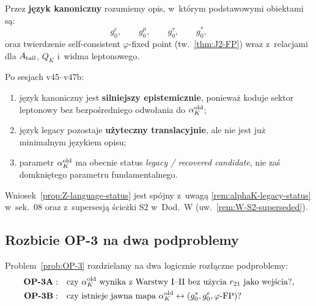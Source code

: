 \begin{definition}\label{def:Z-canonical}
Przez \textbf{j\k{e}zyk kanoniczny} rozumiemy opis,
w~kt\'orym podstawowymi obiektami s\k{a}:
\begin{equation}
  g_0^e, \qquad g_0^\mu, \qquad g_0^\tau, \qquad g_0^*,
\end{equation}
oraz twierdzenie self-consistent $\varphi$-fixed point
(tw.~\ref{thm:J2-FP}) wraz z~relacjami dla
$A_{\rm tail}$, $Q_K$ i~widma leptonowego.
\end{definition}

\begin{proposition}
\label{prop:Z-language-status}
Po sesjach v45--v47b:
\begin{enumerate}[nosep]
  \item j\k{e}zyk kanoniczny jest \textbf{silniejszy epistemicznie},
    poniewa\.z koduje sektor leptonowy bez bezpo\'sredniego
    odwo\l{}ania do $\alpha_K^{\rm old}$;
  \item j\k{e}zyk legacy pozostaje \textbf{u\.zyteczny translacyjnie},
    ale nie jest ju\.z minimalnym j\k{e}zykiem opisu;
  \item parametr $\alpha_K^{\rm old}$ ma obecnie status
    \emph{legacy / recovered candidate}, nie za\'s domkni\k{e}tego
    parametru fundamentalnego.
\end{enumerate}
\end{proposition}

\begin{remark}
Wniosek~\ref{prop:Z-language-status} jest sp\'ojny z~uwag\k{a}
\ref{rem:alphaK-legacy-status} w~sek.~08 oraz z~supersesj\k{a}
\'scie\.zki S2 w~Dod.~W (uw.~\ref{rem:W-S2-superseded}).
\end{remark}

\subsection{Rozbicie OP-3 na dwa podproblemy}
\label{app:Z-OP3-split}

\begin{definition}[Podproblemy OP-3]\label{def:Z-OP3-split}
Problem~\ref{prob:OP-3} rozdzielamy na dwa logicznie roz\l{}\k{a}czne
podproblemy:
\begin{align}
  \textbf{OP-3A}:&\quad
    \text{czy $\alpha_K^{\rm old}$ wynika z~Warstwy~I--II
    bez u\.zycia $r_{21}$ jako wej\'scia?}, \\
  \textbf{OP-3B}:&\quad
    \text{czy istnieje jawna mapa }
    \alpha_K^{\rm old}\leftrightarrow(g_0^*, g_0^e, \varphi\text{-FP})?
\end{align}
\end{definition}

